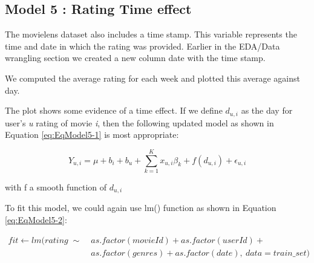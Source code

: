 \documentclass[
]{article}
\begin{document}
\newpage

\hypertarget{model-5-rating-time-effect}{%
\subsection{Model 5 : Rating Time
effect}\label{model-5-rating-time-effect}}

The movielens dataset also includes a time stamp. This variable
represents the time and date in which the rating was provided. Earlier
in the EDA/Data wrangling section we created a new column date with the
time stamp.

We computed the average rating for each week and plotted this average
against day.

The plot shows some evidence of a time effect. If we define \(d_{u,i}\)
as the day for user's \emph{u} rating of movie \emph{i}, then the
following updated model as shown in Equation \ref{eq:EqModel5-1} is most
appropriate:\\

%
\par

\label{eq:EqModel5-1} \begin{equation}
  Y_{u,i} = \mu + b_{i} + b_{u} + \sum_{k=1}^Kx_{u,i}\beta_k + f(d_{u,i}) + \epsilon_{u,i}
\end{equation}

\begin{center}
with f a smooth function of $d_{u,i}$
\end{center}

To fit this model, we could again use lm() function as shown in Equation
\ref{eq:EqModel5-2}:

%
\par

\label{eq:EqModel5-2} \begin{equation}
\begin{split}
  fit \leftarrow lm(rating \; \sim \; & as.factor(movieId) + as.factor(userId) + \\ 
  & as.factor(genres) + as.factor(date), \: data = train\_{}set)
\end{split}
\end{equation}
\end{document}
